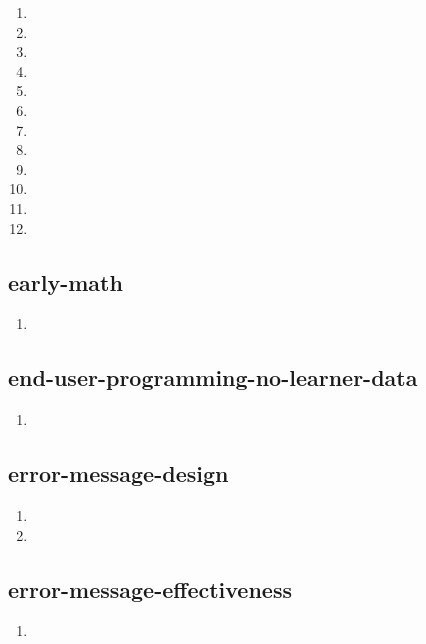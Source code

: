 \documentclass{article}
\begin{document}
\begin{enumerate}
\item {}
\item {}
\item {}
\item {}
\item {}
\item {}
\item {}
\item {}
\item {}
\item {}
\item {}
\item {}
\end{enumerate}

\subsection{early-math}
\begin{enumerate}
\item {}
\end{enumerate}

\subsection{end-user-programming-no-learner-data}
\begin{enumerate}
\item {}
\end{enumerate}

\subsection{error-message-design}
\begin{enumerate}
\item {}
\item {}
\end{enumerate}

\subsection{error-message-effectiveness}
\begin{enumerate}
\item {}
\end{enumerate}
\end{document}
